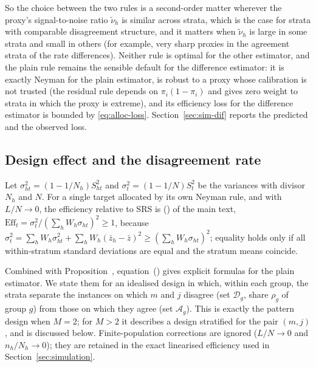 So the choice between the two rules is a second-order matter wherever the proxy's signal-to-noise ratio $\tilde\nu_h$ is similar across strata, which is the case for strata with
comparable disagreement structure, and it matters when $\tilde\nu_h$ is large in some strata and small in others (for example, very sharp proxies in the agreement strata of the
rate differences). Neither rule is optimal for the other estimator, and the plain rule remains the sensible default for the difference estimator: it is exactly Neyman for the plain estimator, is
robust to a proxy whose calibration is not trusted (the residual rule depends on $\pi_i(1-\pi_i)$ and gives zero weight to strata in which the proxy is
extreme), and its efficiency loss for the difference estimator is bounded by \eqref{eq:alloc-loss}. Section~\ref{sec:sim-dif} reports the predicted and the observed loss.

\subsection{Design effect and the disagreement rate}\label{si:theory-deff}

Let $\sigma^2_{ht}=(1-1/N_h)S^2_{ht}$ and $\sigma^2_t=(1-1/N)S^2_t$ be the variances with divisor
$N_h$ and $N$. For a single target allocated by its own Neyman rule, and with $L/N\to0$,
the efficiency relative to SRS is () of the main text,
$\mathrm{Eff}_t=\sigma_t^2/(\sum_hW_h\sigma_{ht})^2\ge1$, because
$\sigma_t^2=\sum_hW_h\sigma_{ht}^2+\sum_hW_h(\bar z_h-\bar z)^2\ge(\sum_hW_h\sigma_{ht})^2$; equality
holds only if all within-stratum standard deviations are equal and the stratum means coincide.

Combined with Proposition~, equation~() gives explicit formulas for the plain estimator.
We state them for an idealised design in which, within each group, the strata separate the
instances on which $m$ and $j$ disagree (set $\mathcal D_g$, share $\rho_g$ of group $g$) from
those on which they agree (set $\mathcal A_g$). This is exactly the pattern design when $M=2$; for
$M>2$ it describes a design stratified for the pair $(m,j)$, and is discussed below.
Finite-population corrections are ignored ($L/N\to0$ and $n_h/N_h\to0$); they are retained in
the exact linearised efficiency used in Section~\ref{sec:simulation}.

